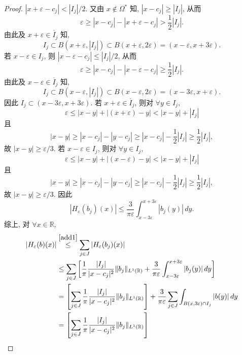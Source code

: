 \documentclass[a4paper,11pt]{article}
\theoremstyle{definition}
\begin{document}
\begin{CJK*}{UTF8}{gbsn}
\begin{proof}
    $ |x + \varepsilon - c_j| < |I_j| / 2 $.
    又由 $ x \notin \Omega^* $ 知, $ |x - c_j| \geq |I_j| $, 从而
    $$
        \varepsilon \geq |x - c_j| - |x + \varepsilon - c_j| > \frac{1}{2} |I_j|.
    $$
    由此及 $ x + \varepsilon \in \mathring{I_j} $ 知,
    $$ 
        I_j \subset B(x + \varepsilon, |I_j|) 
            \subset B(x + \varepsilon, 2 \varepsilon) 
            = (x - \varepsilon, x + 3 \varepsilon). 
    $$
    若 $ x - \varepsilon \in I_j $, 则
    $ |x - \varepsilon - c_j| \leq |I_j| / 2 $, 从而
    $$
        \varepsilon \geq |x - c_j| - |x - \varepsilon - c_j| \geq \frac{1}{2} |I_j|.
    $$
    由此及 $ x - \varepsilon \in \mathring{I_j} $ 知,
    $$ 
        I_j \subset B(x - \varepsilon, |I_j|) 
            \subset B(x - \varepsilon, 2 \varepsilon) 
            = (x - 3 \varepsilon, x + \varepsilon). 
    $$
    因此 $ I_j \subset (x - 3\varepsilon, x + 3\varepsilon) $. 
    若 $ x + \varepsilon \in \mathring{I_j} $, 则对 $ \forall y \in I_j $, 
    $$
        \varepsilon 
            \leq |x - y| + | (x + \varepsilon) - y | 
            < |x - y| + |I_j|
    $$
    且
    $$
        |x - y| \geq |x - c_j| - |y - c_j| \geq |x - c_j| - \frac{1}{2} |I_j| \geq \frac{1}{2} |I_j|,
    $$
    故 $ |x - y| \geq \varepsilon / 3 $. 
    若 $ x - \varepsilon \in I_j $, 则对 $ \forall y \in I_j $, 
    $$
        \varepsilon 
            \leq |x - y| + | (x - \varepsilon) - y | 
            < |x - y| + |I_j|
    $$
    且
    $$
        |x - y| \geq |x - c_j| - |y - c_j| \geq |x - c_j| - \frac{1}{2} |I_j| \geq \frac{1}{2} |I_j|,
    $$
    故 $ |x - y| \geq \varepsilon / 3 $.  
    因此
    $$
        |H_\varepsilon (b_j) (x)|
            \leq \frac{3}{\pi\varepsilon} \int_{x - 3\varepsilon}^{x + 3\varepsilon}  |b_j(y)| \, dy.
    $$
    综上, 对 $ \forall x \in \mathbb{R} $,
    \begin{align} \label{end1}
        |H_\varepsilon (b) (x)| 
            &\overset{\eqref{add1}}{\leq} \sum_{j \in J}  |H_\varepsilon (b_j)(x)|  \\
            &\leq \sum_{j \in J} \left[ \frac{1}{\pi} \frac{|I_j|}{|x - c_j|^2} \|b_j\|_{L^1(\mathbb{R})}
                + \frac{3}{\pi\varepsilon} \int_{x - 3\varepsilon}^{x + 3\varepsilon}  |b_j(y)| \, dy \right] \notag\\
            &= \left[ \sum_{j \in J} \frac{1}{\pi} \frac{|I_j|}{|x - c_j|^2} \|b_j\|_{L^1(\mathbb{R})} \right]
                + \frac{3}{\pi\varepsilon} \sum_{j \in J} \int_{B(x, 3\varepsilon) \cap I_j}  |b(y)| \, dy \notag\\
            &= \left[ \sum_{j \in J} \frac{1}{\pi} \frac{|I_j|}{|x - c_j|^2} \|b_j\|_{L^1(\mathbb{R})} \right]

\end{align}
\end{proof}
\end{CJK*}
\end{document}
